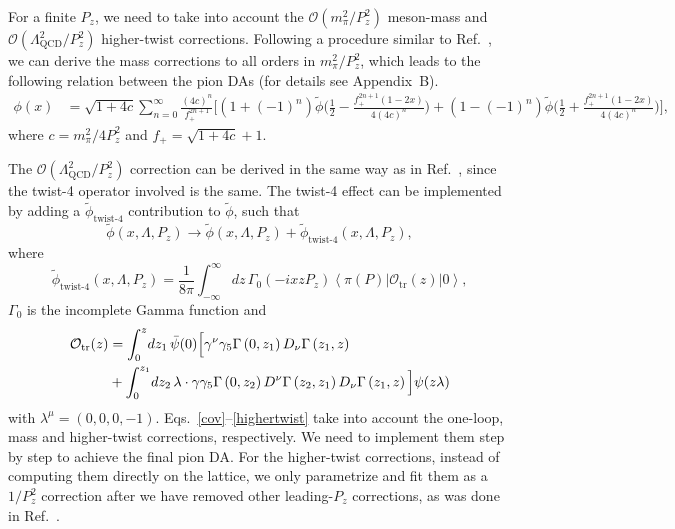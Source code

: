 For a finite $P_z$, we need to take into account {the $\mathcal{O}\left(m^2_{\pi}/P_z^2\right)$
meson-mass and $\mathcal{O}\left(\Lambda^2_\text{QCD}/P_z^2\right)$} higher-twist corrections. Following a procedure similar to Ref.~\cite{Chen:2016utp}, we can derive the mass corrections to all orders in $m^2_{\pi}/P_z^2$, which leads to the following relation between the pion DAs (for details see Appendix~B).
\begin{align}\label{masscorr}
\phi(x)&=\sqrt{1+4c}\sum_{n=0}^\infty \frac{(4c)^n}{f_+^{2n+1}}\Big[(1+(-1)^n)\tilde\phi\Big(\frac{1}{2}-\frac{f_+^{2n+1}(1-2x)}{4(4c)^n}\Big)+(1-(-1)^n)\tilde\phi\Big(\frac{1}{2}+\frac{f_+^{2n+1}(1-2x)}{4(4c)^n}\Big)\Big],
\end{align}
where $c=m_\pi^2/4P_z^2$ and $ f_{+}=\sqrt{1+4c}+ 1$.


The $\mathcal{O}\left(\Lambda^2_\text{QCD}/P_z^2\right)$ correction can be derived in the same way as in Ref.~\cite{Chen:2016utp}, since the twist-4 operator involved is the same. The twist-4 effect can be implemented by adding a
$\tilde{\phi}_\text{twist-4}$ contribution to $\tilde{\phi}$, such that
\begin{equation}\label{highertwist}
\tilde{\phi}(x,\Lambda,P_z) \rightarrow
  \tilde{\phi}(x,\Lambda,P_z) + \tilde{\phi}_\text{twist-4}(x,\Lambda,P_z),
\end{equation}
where
\begin{equation}
\tilde{\phi}_\text{twist-4}(x,\Lambda,P_z) =
  \frac{1}{8\pi}\int_{-\infty}^\infty\!dz\,\Gamma_0 \left(-ixzP_z\right)
  \left\langle \pi(P)\left\vert \mathcal{O}_\text{tr}(z)\right\vert 0\right\rangle,
  \label{t4-1}
\end{equation}
$\Gamma_0$ is the incomplete Gamma function and
\begin{align}
\mathcal{O}_\text{tr}(z) &=
  \int_0^z\!dz_1\,\bar{\psi}(0) \Big[ \gamma^\nu\gamma_5 \Gamma\left(0,z_1\right)
    D_\nu\Gamma \left(z_1,z\right) \notag \\
&{} + \int_0^{z_1}\!dz_2\, \lambda \cdot \gamma\gamma_5
  \Gamma\left(0,z_2 \right) D^\nu \Gamma \left(z_2,z_1\right)
  D_\nu \Gamma\left(z_1,z\right) \Big] \psi (z\lambda)  \label{t4-2}
\end{align}
with $\lambda^\mu=(0,0,0,-1)$. Eqs.~\ref{cov}--\ref{highertwist} take into account the one-loop, mass and higher-twist corrections, respectively. We need to implement them step by step to achieve the final pion DA. For the higher-twist corrections, instead of computing them directly on the lattice, we only
parametrize and fit them as a $1/P_z^2$ correction after we have
removed other leading-$P_z$ corrections, as was done in Ref.~\cite{Chen:2016utp}.

%
